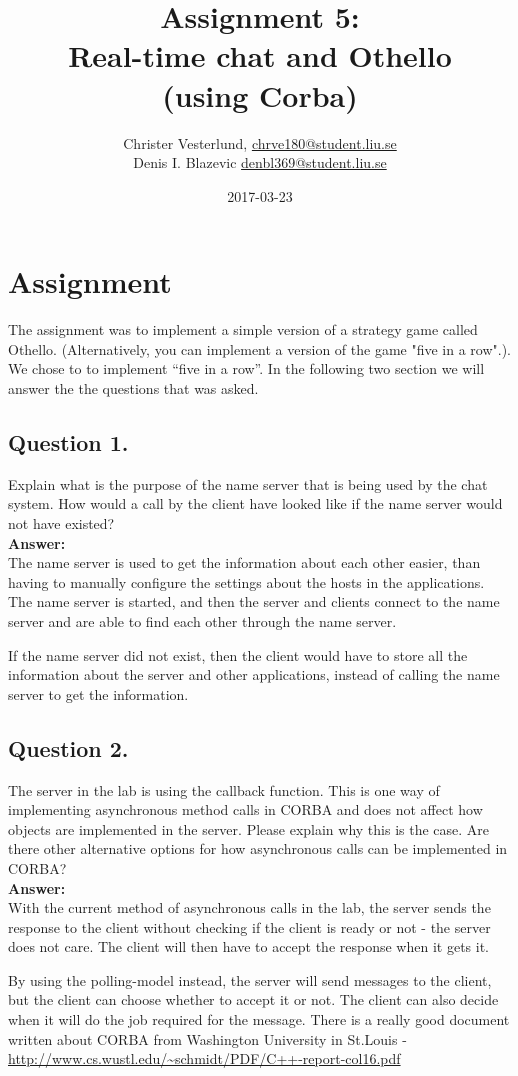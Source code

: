 \documentclass{mall}
\author{Christer Vesterlund, \url{chrve180@student.liu.se}\\
  Denis I. Blazevic \url{denbl369@student.liu.se}}
\title{Assignment 5:\\Real-time chat and Othello \\(using Corba)}
\date{2017-03-23}
\begin{document}
\projectpage
\newpage 

\section{Assignment}
The assignment was to implement a simple version of a strategy game called Othello. (Alternatively, you can implement a version of the game "five in a row".). We chose to to implement “five in a row”. In the following two section we will answer the the questions that was asked.
\subsection{Question 1.}
Explain what is the purpose of the name server that is being used by the chat system. How would a call by the client have looked like if the name server would not have existed?\\

\setlength{\parindent}{0mm}
\textbf{Answer:}\\
The name server is used to get the information about each other easier, than having to manually configure the settings about the hosts in the applications. The name server is started, and then the server and clients connect to the name server and are able to find each other through the name server.

If the name server did not exist, then the client would have to store all the information about the server and other applications, instead of calling the name server to get the information.
\subsection{Question 2.}
The server in the lab is using the callback function. This is one way of implementing asynchronous method calls in CORBA and does not affect how objects are implemented in the server. Please explain why this is the case. Are there other alternative options for how asynchronous calls can be implemented in CORBA?\\

\setlength{\parindent}{0mm}
\textbf{Answer:}\\
With the current method of asynchronous calls in the lab, the server sends the response to the client without checking if the client is ready or not - the server does not care. The client will then have to accept the response when it gets it. 

By using the polling-model instead, the server will send messages to the client, but the client can choose whether to accept it or not. The client can also decide when it will do the job required for the message. There is a really good document written about CORBA from Washington University in St.Louis -\\ \url{http://www.cs.wustl.edu/~schmidt/PDF/C++-report-col16.pdf}
\end{document}
